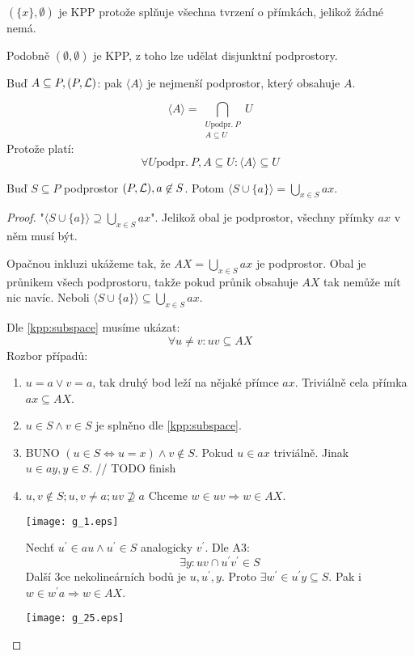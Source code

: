 \begin{observation}
	$(\{ x \}, \emptyset)$ je KPP protože splňuje všechna tvrzení o přímkách, jelikož žádné nemá.

	Podobně $( \emptyset, \emptyset)$ je KPP, z toho lze udělat disjunktní podprostory.
\end{observation}

\begin{definition}[Obal]
    Buď $A \subseteq P, (P, \operatorname{\mathcal{L}})$: pak $\langle A \rangle$ je nejmenší podprostor, který obsahuje $A$.

    \[ \langle A \rangle = \bigcap_{\substack{U \text{podpr.}\ P \\ A \subseteq U }} U \]
    Protože platí:
    \[ \forall U \text{podpr.}\ P, A \subseteq U: \langle A \rangle \subseteq U \]
\end{definition}

\begin{lemma}\label{kpp:point_add_sub}
    Buď $S \subseteq P$ podprostor $(P, \operatorname{\mathcal{L}}), a \not\in S$.
    Potom $\langle S \cup \{a\} \rangle = \bigcup_{x\in S}ax$.
\end{lemma}
\begin{proof}
	"$\langle S \cup \{a\} \rangle \supseteq \bigcup_{x\in S}ax$".
	Jelikož obal je podprostor, všechny přímky $ax$ v něm musí být.

	Opačnou inkluzi ukážeme tak, že $AX = \bigcup_{x\in S} ax$ je podprostor.
	Obal je průnikem všech podprostoru, takže pokud průnik obsahuje $AX$ tak nemůže mít nic navíc.
	Neboli $\langle S \cup \{a\} \rangle \subseteq \bigcup_{x\in S}ax$.

	Dle \cref{kpp:subspace} musíme ukázat:
	\[ \forall u \ne v: uv \subseteq AX \]
	Rozbor případů:
	\begin{enumerate}
		\item $u = a \lor v = a$, tak druhý bod leží na nějaké přímce $ax$.
			Triviálně cela přímka $ax \subseteq AX$.
		\item $u \in S \land v \in S$ je splněno dle \cref{kpp:subspace}.
		\item BUNO $(u \in S \iff u = x) \land v \not\in S$.
			Pokud $u \in ax$ triviálně.
			Jinak $u \in ay, y \in S$.
			// TODO finish
		\item $u, v \notin S; u, v \ne a; uv \nsupseteq a$
			Chceme $w \in uv \Rightarrow w \in AX$.

		\texttt{[image: g\_1.eps]}

		Nechť $u^{\prime} \in au \land u^{\prime} \in S$ analogicky $v^{\prime}$.
		Dle A3:
		\[ \exists y: uv \cap u^{\prime}v^{\prime} \in S \]
		Další 3ce nekolineárních bodů je $u, u^{\prime}, y$.
		Proto $\exists w^{\prime} \in u^{\prime}y \subseteq S$.
		Pak i $w \in w^{\prime}a \Rightarrow w \in AX$.

		\texttt{[image: g\_25.eps]}
	\end{enumerate}
\end{proof}

